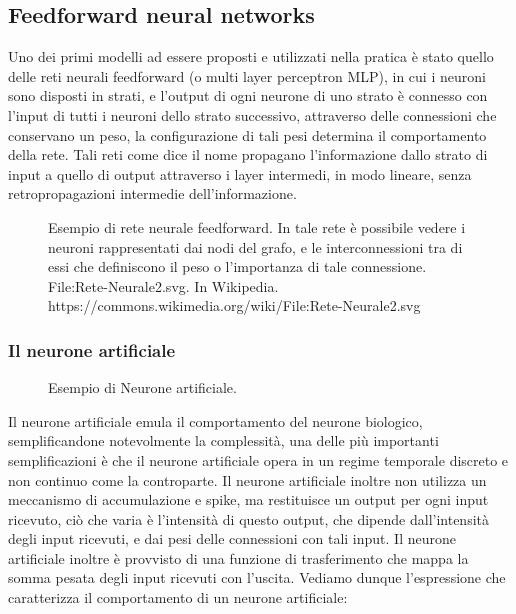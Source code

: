 \subsection{Feedforward neural networks}

Uno dei primi modelli ad essere proposti e utilizzati nella pratica è stato quello delle reti neurali feedforward (o multi layer perceptron MLP),
in cui i neuroni sono disposti in strati, e l'output di ogni neurone di uno strato è connesso con l'input di tutti i neuroni dello strato successivo, 
attraverso delle connessioni che conservano un peso, la configurazione di tali pesi determina il comportamento della rete.
Tali reti come dice il nome propagano l'informazione dallo strato di input a quello di output attraverso i layer intermedi,
in modo lineare, senza retropropagazioni intermedie dell'informazione.

    \begin{figure}[H]
        \centering
        
        \caption{Esempio di rete neurale feedforward. In tale rete è possibile vedere i neuroni rappresentati dai nodi del grafo, e
        le interconnessioni tra di essi che definiscono il peso o l'importanza di tale connessione.\\
        File:Rete-Neurale2.svg. In Wikipedia. https://commons.wikimedia.org/wiki/File:Rete-Neurale2.svg}
        \label{fig:feedforward_nn}
    \end{figure}

\subsubsection{Il neurone artificiale}

    \begin{figure}
        \centering
        \vspace{-25pt}
        
        \caption{Esempio di Neurone artificiale.}
        \label{fig:artificial_neuron}
        \vspace{0pt}
    \end{figure}

Il neurone artificiale emula il comportamento del neurone biologico, semplificandone notevolmente la complessità,
una delle più importanti semplificazioni è che il neurone artificiale opera in un regime temporale discreto e non continuo come la controparte.
Il neurone artificiale inoltre non utilizza un meccanismo di accumulazione e spike, ma restituisce un output per ogni input ricevuto,
ciò che varia è l'intensità di questo output, che dipende dall'intensità degli input ricevuti, e dai pesi delle connessioni con tali input.
Il neurone artificiale inoltre è provvisto di una funzione di trasferimento che mappa la somma pesata degli input ricevuti con l'uscita.
Vediamo dunque l'espressione che caratterizza il comportamento di un neurone artificiale:

